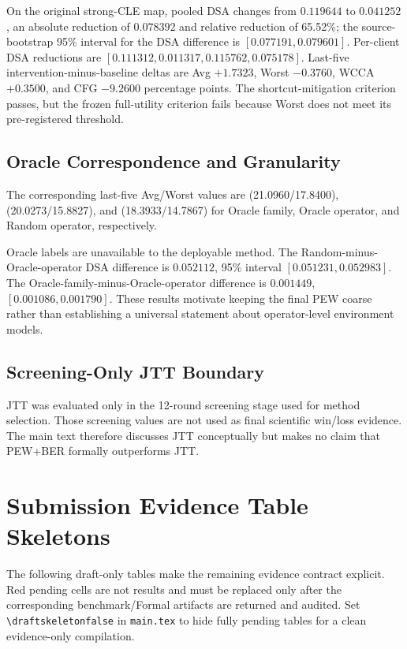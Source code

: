 On the original strong-CLE map, pooled DSA changes from \(0.119644\) to \(0.041252\), an absolute reduction of \(0.078392\) and relative reduction of 65.52\%; the source-bootstrap 95\% interval for the DSA difference is \([0.077191,0.079601]\). Per-client DSA reductions are \([0.111312,0.011317,0.115762,0.075178]\). Last-five intervention-minus-baseline deltas are Avg \(+1.7323\), Worst \(-0.3760\), WCCA \(+0.3500\), and CFG \(-9.2600\) percentage points. The shortcut-mitigation criterion passes, but the frozen full-utility criterion fails because Worst does not meet its pre-registered threshold.

\subsection{Oracle Correspondence and Granularity}



The corresponding last-five Avg/Worst values are (21.0960/17.8400),
(20.0273/15.8827), and (18.3933/14.7867) for Oracle family, Oracle
operator, and Random operator, respectively.

Oracle labels are unavailable to the deployable method. The Random-minus-Oracle-operator DSA difference is \(0.052112\), 95\% interval \([0.051231,0.052983]\). The Oracle-family-minus-Oracle-operator difference is \(0.001449\), \([0.001086,0.001790]\). These results motivate keeping the final PEW coarse rather than establishing a universal statement about operator-level environment models.

\subsection{Screening-Only JTT Boundary}

JTT was evaluated only in the 12-round screening stage used for method selection. Those screening values are not used as final scientific win/loss evidence. The main text therefore discusses JTT conceptually \citep{liu2021jtt} but makes no claim that PEW+BER formally outperforms JTT.

\section{Submission Evidence Table Skeletons}

The following draft-only tables make the remaining evidence contract explicit. Red pending cells are not results and must be replaced only after the corresponding benchmark/Formal artifacts are returned and audited. Set \verb|\draftskeletonfalse| in \verb|main.tex| to hide fully pending tables for a clean evidence-only compilation.

